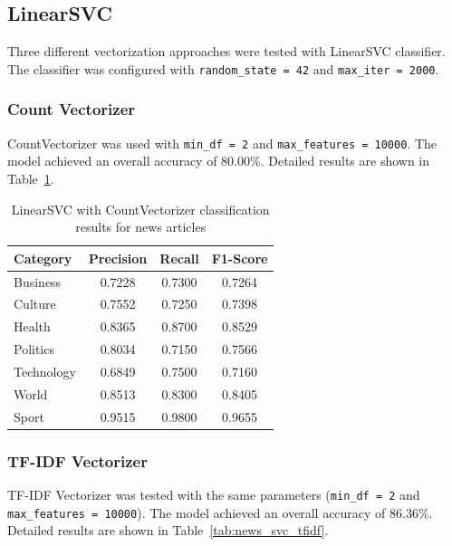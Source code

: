 \documentclass[12pt,a4paper]{article}
\begin{document}
\subsection{LinearSVC}

Three different vectorization approaches were tested with LinearSVC classifier. The classifier was configured with \texttt{random\_state = 42} and \texttt{max\_iter = 2000}.

\subsubsection{Count Vectorizer}

CountVectorizer was used with \texttt{min\_df = 2} and \texttt{max\_features = 10000}. The model achieved an overall accuracy of 80.00\%. Detailed results are shown in Table~\ref{tab:news_svc_count}.

\begin{table}[h]
\centering
\begin{tabular}{lccc}
\toprule
Category & Precision & Recall & F1-Score \\
\midrule
Business & 0.7228 & 0.7300 & 0.7264 \\
Culture & 0.7552 & 0.7250 & 0.7398 \\
Health & 0.8365 & 0.8700 & 0.8529 \\
Politics & 0.8034 & 0.7150 & 0.7566 \\
Technology & 0.6849 & 0.7500 & 0.7160 \\
World & 0.8513 & 0.8300 & 0.8405 \\
Sport & 0.9515 & 0.9800 & 0.9655 \\
\bottomrule
\end{tabular}
\caption{LinearSVC with CountVectorizer classification results for news articles}
\label{tab:news_svc_count}
\end{table}

\subsubsection{TF-IDF Vectorizer}

TF-IDF Vectorizer was tested with the same parameters (\texttt{min\_df = 2} and \texttt{max\_features = 10000}). The model achieved an overall accuracy of 86.36\%. Detailed results are shown in Table~\ref{tab:news_svc_tfidf}.
\end{document}
